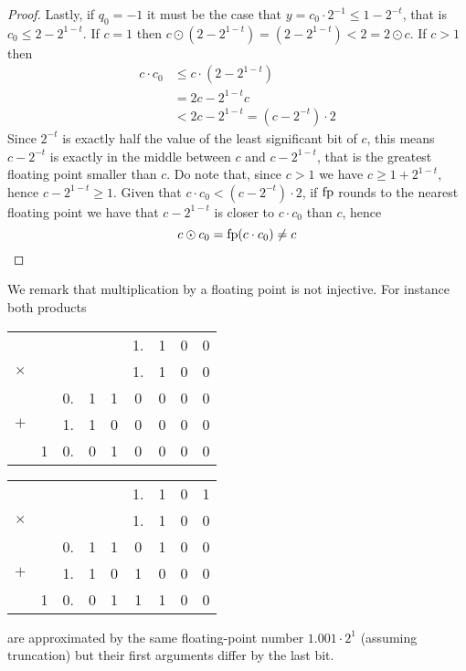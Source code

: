 \begin{proof}
	Lastly, if $q_0 = -1$ it must be the case that $y = c_0 \cdot 2^{-1} \le 1 - 2^{-t}$, that is $c_0 \le 2 - 2^{1-t}$.
	If $c = 1$ then $c \odot (2 - 2^{1-t}) = (2 - 2^{1-t}) < 2 = 2 \odot c$. If $c > 1$ then
	\begin{align*}
		c \cdot c_0 &\le c \cdot (2 - 2^{1-t}) \\
		&= 2 c - 2^{1-t} c \\
		&< 2 c - 2^{1-t} = (c - 2^{-t}) \cdot 2
	\end{align*}
	Since $2^{-t}$ is exactly half the value of the least significant bit of $c$, this means $c - 2^{-t}$ is exactly in the middle between $c$ and $c - 2^{1-t}$, that is the greatest floating point smaller than $c$. Do note that, since $c > 1$ we have $c \ge 1 + 2^{1-t}$, hence $c - 2^{1-t} \ge 1$. Given that $c \cdot c_0 < (c - 2^{-t}) \cdot 2$, if $\text{fp}$ rounds to the nearest floating point we have that $c - 2^{1-t}$ is closer to $c \cdot c_0$ than $c$, hence
	\[
	c \odot c_0 = \text{fp}(c \cdot c_0) \neq c
	\]
\end{proof}

We remark that multiplication by a floating point is not injective. For instance both products
\begin{center}
	\parbox{0.45\textwidth}{\centering
		\begin{tabular}{c@{\;}c@{\;}c@{\,}c@{\,}c@{\,}c@{\,}c@{\,}c@{\,}c}
			& & & & & 1. & 1 & 0 & 0 \\
			$\times$ & & & & & 1. & 1 & 0 & 0 \\
			\hline
			& & 0. & 1 & 1 & 0 & 0 & 0 & 0\\
			$+$ & & 1. & 1 & 0 & 0 & 0 & 0 & 0 \\
			\hline
			& 1 & 0. & 0 & 1 & 0 & 0 & 0 & 0
	\end{tabular}}
	\parbox{0.45\textwidth}{\centering
		\begin{tabular}{c@{\;}c@{\;}c@{\,}c@{\,}c@{\,}c@{\,}c@{\,}c@{\,}c}
			& & & & & 1. & 1 & 0 & 1 \\
			$\times$ & & & & & 1. & 1 & 0 & 0 \\
			\hline
			& & 0. & 1 & 1 & 0 & 1 & 0 & 0\\
			$+$ & & 1. & 1 & 0 & 1 & 0 & 0 & 0 \\
			\hline
			& 1 & 0. & 0 & 1 & 1 & 1 & 0 & 0
	\end{tabular}}
\end{center}
are approximated by the same floating-point number $1.001 \cdot 2^1$ (assuming truncation) but their first arguments differ by the last bit.

